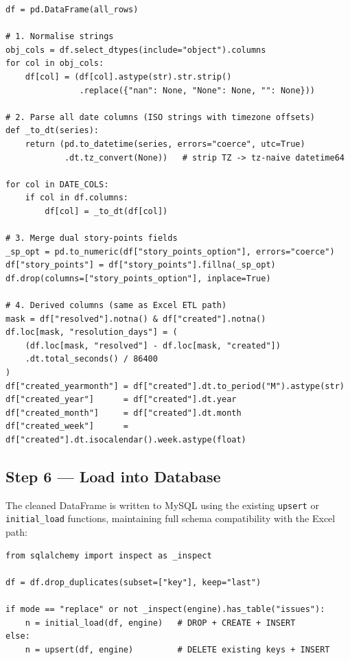 \documentclass[12pt, a4paper]{article}
\begin{document}
\begin{lstlisting}[style=python, caption={Transform pipeline}]
df = pd.DataFrame(all_rows)

# 1. Normalise strings
obj_cols = df.select_dtypes(include="object").columns
for col in obj_cols:
    df[col] = (df[col].astype(str).str.strip()
               .replace({"nan": None, "None": None, "": None}))

# 2. Parse all date columns (ISO strings with timezone offsets)
def _to_dt(series):
    return (pd.to_datetime(series, errors="coerce", utc=True)
            .dt.tz_convert(None))   # strip TZ -> tz-naive datetime64

for col in DATE_COLS:
    if col in df.columns:
        df[col] = _to_dt(df[col])

# 3. Merge dual story-points fields
_sp_opt = pd.to_numeric(df["story_points_option"], errors="coerce")
df["story_points"] = df["story_points"].fillna(_sp_opt)
df.drop(columns=["story_points_option"], inplace=True)

# 4. Derived columns (same as Excel ETL path)
mask = df["resolved"].notna() & df["created"].notna()
df.loc[mask, "resolution_days"] = (
    (df.loc[mask, "resolved"] - df.loc[mask, "created"])
    .dt.total_seconds() / 86400
)
df["created_yearmonth"] = df["created"].dt.to_period("M").astype(str)
df["created_year"]      = df["created"].dt.year
df["created_month"]     = df["created"].dt.month
df["created_week"]      = df["created"].dt.isocalendar().week.astype(float)
\end{lstlisting}

\subsection{Step 6 — Load into Database}

The cleaned DataFrame is written to MySQL using the existing \texttt{upsert} or
\texttt{initial\_load} functions, maintaining full schema compatibility with the Excel path:

\begin{lstlisting}[style=python, caption={Load to DB}]
from sqlalchemy import inspect as _inspect

df = df.drop_duplicates(subset=["key"], keep="last")

if mode == "replace" or not _inspect(engine).has_table("issues"):
    n = initial_load(df, engine)   # DROP + CREATE + INSERT
else:
    n = upsert(df, engine)         # DELETE existing keys + INSERT
\end{lstlisting}
\end{document}

